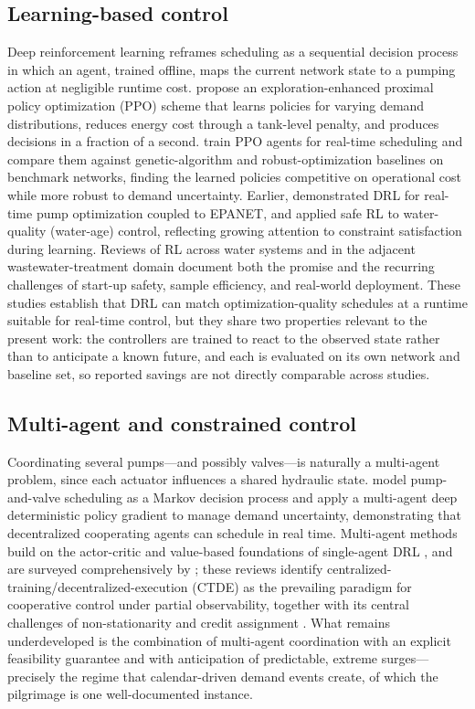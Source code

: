 \documentclass[11pt,a4paper]{article}
\begin{document}
\subsection{Learning-based control}
Deep reinforcement learning reframes scheduling as a sequential decision process
in which an agent, trained offline, maps the current network state to a pumping
action at negligible runtime cost. \citet{Hu2023EPPO} propose an
exploration-enhanced proximal policy optimization (PPO) scheme that learns
policies for varying demand distributions, reduces energy cost through a
tank-level penalty, and produces decisions in a fraction of a second.
\citet{Pei2025RTPump} train PPO agents for real-time scheduling and compare them
against genetic-algorithm and robust-optimization baselines on benchmark
networks, finding the learned policies competitive on operational cost while more
robust to demand uncertainty. Earlier, \citet{Hajgato2020DRLEPANET} demonstrated
DRL for real-time pump optimization coupled to EPANET, and
\citet{Ledesma2024SafeRL} applied safe RL to water-quality (water-age) control,
reflecting growing attention to constraint satisfaction during learning. Reviews
of RL across water systems \citep{Negm2024RLWaterReview} and in the adjacent
wastewater-treatment domain \citep{Croll2023RLWWTP} document both the promise and
the recurring challenges of start-up safety, sample efficiency, and real-world
deployment. These studies establish that DRL can match
optimization-quality schedules at a runtime suitable for real-time control, but
they share two properties relevant to the present work: the controllers are
trained to react to the observed state rather than to anticipate a known future,
and each is evaluated on its own network and baseline set, so reported savings
are not directly comparable across studies.

\subsection{Multi-agent and constrained control}
Coordinating several pumps---and possibly valves---is naturally a multi-agent
problem, since each actuator influences a shared hydraulic state.
\citet{Hu2023MARL} model pump-and-valve scheduling as a Markov decision process
and apply a multi-agent deep deterministic policy gradient
\citep{Lowe2017MADDPG} to manage demand uncertainty, demonstrating that
decentralized cooperating agents can schedule in real time. Multi-agent methods build on the actor-critic and value-based foundations of
single-agent DRL
\citep{Mnih2015DQN,Lillicrap2016DDPG,Schulman2017PPO,Fujimoto2018TD3,Haarnoja2018SAC},
and are surveyed comprehensively by
\citet{Nguyen2020MARLSurvey,Gronauer2022MADRL,Canese2021MARLReview}; these reviews
identify centralized-training/decentralized-execution (CTDE) as the prevailing
paradigm for cooperative control under partial observability, together with its
central challenges of non-stationarity and credit assignment
\citep{Sutton2018RL}. What
remains underdeveloped is the combination of multi-agent coordination with an
explicit feasibility guarantee and with anticipation of predictable, extreme
surges---precisely the regime that calendar-driven demand events create, of which
the pilgrimage is one well-documented instance.
\end{document}
